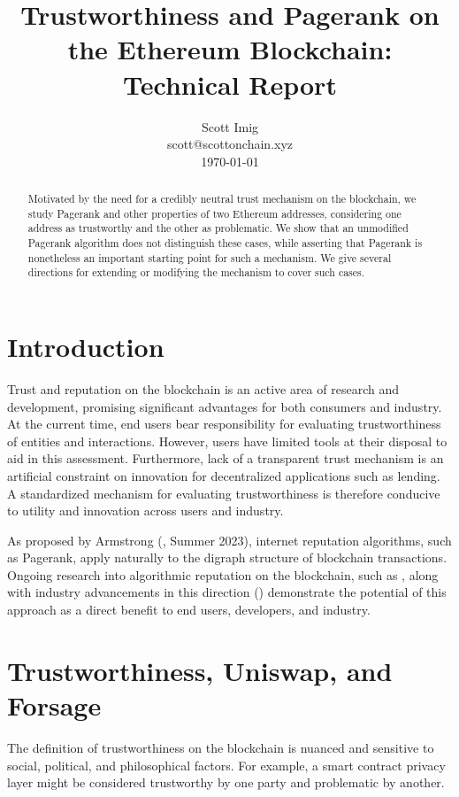 \documentclass[a4paper]{article}
\title{Trustworthiness and Pagerank on the Ethereum Blockchain: Technical Report}
\author{Scott Imig\\
scott@scottonchain.xyz\\
\today}
\begin{document}
\maketitle

\begin{abstract}
Motivated by the need for a credibly neutral trust mechanism on the blockchain, we study Pagerank and other properties of two Ethereum addresses, considering one address as trustworthy and the other as problematic.  We show that an unmodified Pagerank algorithm does not distinguish these cases, while asserting that Pagerank is nonetheless an important starting point for such a mechanism.  We give several directions for extending or modifying the mechanism to cover such cases.
\end{abstract}



\section{Introduction}

Trust and reputation on the blockchain is an active area of research and development, promising significant advantages for both consumers and industry.  At the current time, end users bear responsibility for evaluating trustworthiness of entities and interactions. However, users have limited tools at their disposal to aid in this assessment. Furthermore, lack of a transparent trust mechanism is an artificial constraint on innovation for decentralized applications such as lending.  A standardized mechanism for evaluating trustworthiness is therefore conducive to utility and innovation across users and industry.

As proposed by Armstrong (\cite{Armstrong}, Summer 2023), internet reputation algorithms, such as Pagerank, apply naturally to the digraph structure of blockchain transactions.  Ongoing research into algorithmic reputation on the blockchain, such as \cite{Paven2}, along with industry advancements in this direction (\cite{Octan}) demonstrate the potential of this approach as a direct benefit to end users, developers, and industry.

\section{Trustworthiness, Uniswap, and Forsage}

The definition of trustworthiness on the blockchain is nuanced and sensitive to social, political, and philosophical factors.  For example, a smart contract privacy layer might be considered trustworthy by one party and problematic by another.  
\end{document}
